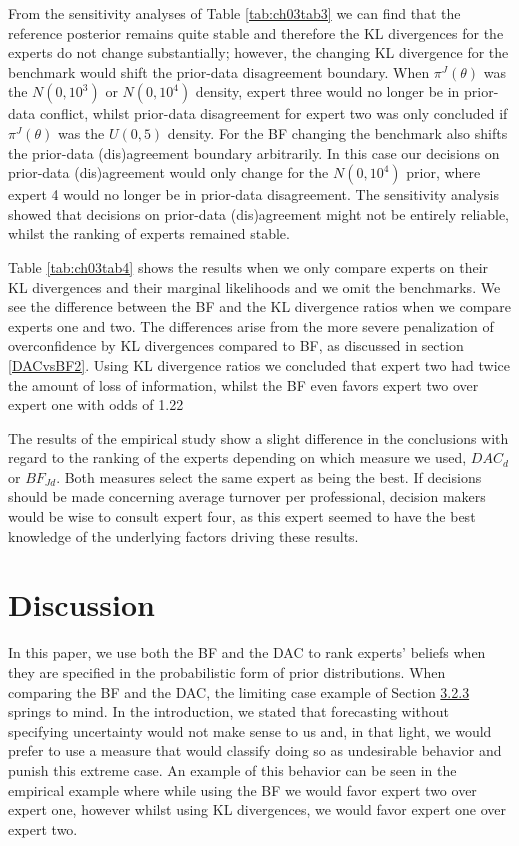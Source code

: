 \documentclass[openright,titlepage,12pt,a4paper]{book}
\begin{document}
From the sensitivity analyses of Table \ref{tab:ch03tab3} we can find that the reference posterior remains quite stable and therefore the KL divergences for the experts do not change substantially; however, the changing KL divergence for the benchmark would shift the prior-data disagreement boundary. When \(\pi^J(\theta)\) was the \(N(0,10^3)\) or \(N(0,10^4)\) density, expert three would no longer be in prior-data conflict, whilst prior-data disagreement for expert two was only concluded if \(\pi^J(\theta)\) was the \(U(0, 5)\) density. For the BF changing the benchmark also shifts the prior-data (dis)agreement boundary arbitrarily. In this case our decisions on prior-data (dis)agreement would only change for the \(N(0, 10^4)\) prior, where expert 4 would no longer be in prior-data disagreement. The sensitivity analysis showed that decisions on prior-data (dis)agreement might not be entirely reliable, whilst the ranking of experts remained stable.

Table \ref{tab:ch03tab4} shows the results when we only compare experts on their KL divergences and their marginal likelihoods and we omit the benchmarks. We see the difference between the BF and the KL divergence ratios when we compare experts one and two. The differences arise from the more severe penalization of overconfidence by KL divergences compared to BF, as discussed in section \ref{DACvsBF2}. Using KL divergence ratios we concluded that expert two had twice the amount of loss of information, whilst the BF even favors expert two over expert one with odds of 1.22

The results of the empirical study show a slight difference in the conclusions with regard to the ranking of the experts depending on which measure we used, \(DAC_d\) or \(BF_{Jd}\). Both measures select the same expert as being the best. If decisions should be made concerning average turnover per professional, decision makers would be wise to consult expert four, as this expert seemed to have the best knowledge of the underlying factors driving these results.

\hypertarget{ch03discussion}{%
\section{Discussion}\label{ch03discussion}}

In this paper, we use both the BF and the DAC to rank experts' beliefs when they are specified in the probabilistic form of prior distributions. When comparing the BF and the DAC, the limiting case example of Section \protect\hyperlink{DACvsBF2}{3.2.3} springs to mind. In the introduction, we stated that forecasting without specifying uncertainty would not make sense to us and, in that light, we would prefer to use a measure that would classify doing so as undesirable behavior and punish this extreme case. An example of this behavior can be seen in the empirical example where while using the BF we would favor expert two over expert one, however whilst using KL divergences, we would favor expert one over expert two.
\end{document}
